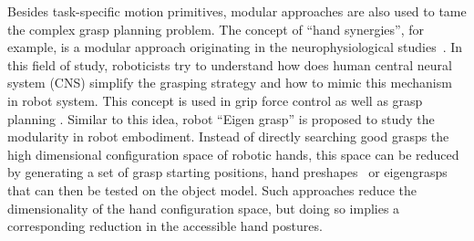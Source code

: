 Besides task-specific motion primitives, modular approaches are also used to tame the complex grasp planning problem. The concept of ``hand synergies'', for example, is a modular approach originating in the neurophysiological studies~\citep{santello1998postural,santello2000force}. In this field of study, roboticists try to understand how does human central neural system (CNS) simplify the grasping strategy and how to mimic this mechanism in robot system. This concept is used in grip force control \citep{gabiccini2011role} as well as grasp planning \citep{gioioso2013mapping}. Similar to this idea, robot ``Eigen grasp'' is proposed to study the modularity in robot embodiment. Instead of directly searching good grasps the high dimensional configuration space of robotic hands, this space can be reduced by generating a set of grasp starting positions, hand preshapes~\cite{miller2003automatic} or eigengrasps~\cite{Ciocarlie2009} that can then be tested on the object model. Such approaches reduce the dimensionality of the hand configuration space, but doing so implies a corresponding reduction in the accessible hand postures.








